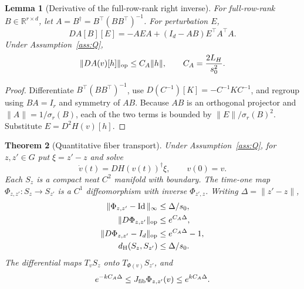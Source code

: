\documentclass[11pt]{article}
\newtheorem{theorem}{Theorem}[section]
\newtheorem{lemma}[theorem]{Lemma}
\theoremstyle{definition}
\newcommand{\R}{\mathbb R}
\begin{document}
\begin{lemma}[Derivative of the full-row-rank right inverse]
\label{lem:pinv}
For full-row-rank $B\in\R^{r\times d}$, let
$A=B^\dagger=B^\top(BB^\top)^{-1}$.  For perturbation $E$,
\[
 DA[B][E]=-AEA+(I_d-AB)E^\top A^\top A.
\]
Under Assumption~\ref{ass:Q},
\[
 \|DA(v)[h]\|_{\rm op}\le C_A\|h\|,
 \qquad C_A=\frac{2L_H}{s_0^2}.
\]
\end{lemma}

\begin{proof}
Differentiate $B^\top(BB^\top)^{-1}$, use
$D(C^{-1})[K]=-C^{-1}KC^{-1}$, and regroup using $BA=I_r$ and symmetry of
$AB$.  Because $AB$ is an orthogonal projector and
$\|A\|=1/\sigma_r(B)$, each of the two terms is bounded by
$\|E\|/\sigma_r(B)^2$.  Substitute $E=D^2H(v)[h]$.
\end{proof}

\begin{theorem}[Quantitative fiber transport]\label{thm:transport}
Under Assumption~\ref{ass:Q}, for $z,z'\in G$ put $\xi=z'-z$ and solve
\[
 \dot v(t)=DH(v(t))^\dagger\xi,\qquad v(0)=v.
\]
Each $S_z$ is a compact neat $C^2$ manifold with boundary.  The time-one map
$\Phi_{z,z'}:S_z\to S_{z'}$ is a $C^1$ diffeomorphism with inverse
$\Phi_{z',z}$.  Writing $\Delta=\|z'-z\|$,
\begin{align}
 \|\Phi_{z,z'}-\operatorname{Id}\|_\infty&\le\Delta/s_0,\label{eq:motion}\\
 \|D\Phi_{z,z'}\|_{\rm op}&\le e^{C_A\Delta},\label{eq:dflow}\\
 \|D\Phi_{z,z'}-I_d\|_{\rm op}
 &\le e^{C_A\Delta}-1,\label{eq:dflow-minus-id}\\
 d_{\rm H}(S_z,S_{z'})&\le\Delta/s_0.\label{eq:hausdorff}
\end{align}
The differential maps $T_vS_z$ onto $T_{\Phi(v)}S_{z'}$, and
\begin{equation}\label{eq:fiber-jac}
 e^{-kC_A\Delta}\le J_{\rm fib}\Phi_{z,z'}(v)
 \le e^{kC_A\Delta}.
\end{equation}
\end{theorem}
\end{document}
